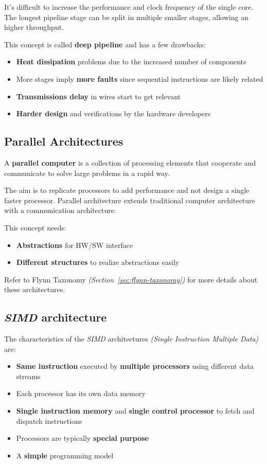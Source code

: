 \documentclass[english]{article}
\begin{document}
It's difficult to increase the performance and clock frequency of the single core.
The longest pipeline stage can be split in multiple smaller stages, allowing an higher throughput.

This concept is called \textbf{deep pipeline} and has a few drawbacks:

\begin{itemize}
  \item \textbf{Heat dissipation} problems due to the increased number of components
  \item More stages imply \textbf{more faults} since sequential instructions are likely related
  \item \textbf{Transmissions delay} in wires start to get relevant
  \item \textbf{Harder design} and verifications by the hardware developers
\end{itemize}

\subsection{Parallel Architectures}

A \textbf{parallel computer} is a collection of processing elements that cooperate and communicate to solve large problems in a rapid way.

The aim is to replicate processors to add performance and not design a single faster processor.
Parallel architecture extends traditional computer architecture with a communication architecture.

This concept needs:

\begin{itemize}
  \item \textbf{Abstractions} for HW/SW interface
  \item \textbf{Different structures} to realize abstractions easily
\end{itemize}

Refer to Flynn Taxonomy \textit{(Section~\ref{sec:flynn-taxonomy})} for more details about these architectures.

\subsection{\textit{SIMD} architecture}

The characteristics of the \textit{SIMD} architectures \textit{(Single Instruction Multiple Data)} are:

\begin{itemize}
  \item \textbf{Same instruction} executed by \textbf{multiple processors} using different data streams
  \item Each processor has its own data memory
  \item \textbf{Single instruction memory} and \textbf{single control processor} to fetch and dispatch instructions
  \item Processors are typically \textbf{special purpose}
  \item A \textbf{simple} programming model
\end{itemize}
\end{document}

